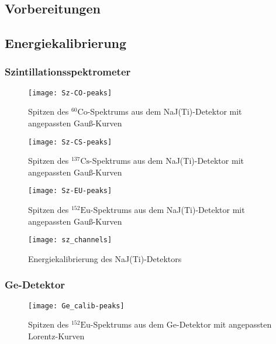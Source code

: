\documentclass[11pt, ngerman, fleqn, DIV=15, headinclude, BCOR=2cm]{scrreprt}
\newcommand{\plotwidth}{0.8\linewidth}
\begin{document}
\begin{appendix}


\chapter{Vorbereitungen}
\section{Energiekalibrierung}

\subsection{Szintillationsspektrometer}
\begin{figure}
    \centering
    \texttt{[image: Sz-CO-peaks]}
    \caption{%
	    Spitzen des $^{60}\text{Co}$-Spektrums aus dem NaJ(Ti)-Detektor
	    mit angepassten Gauß-Kurven
    }
    \label{fig:}
\end{figure}

\begin{figure}
    \centering
    \texttt{[image: Sz-CS-peaks]}
    \caption{%
	    Spitzen des $^{137}\text{Cs}$-Spektrums aus dem NaJ(Ti)-Detektor
	    mit angepassten Gauß-Kurven
    }
    \label{fig:}
\end{figure}

\begin{figure}
    \centering
    \texttt{[image: Sz-EU-peaks]}
    \caption{%
	    Spitzen des $^{152}\text{Eu}$-Spektrums aus dem NaJ(Ti)-Detektor
	    mit angepassten Gauß-Kurven
    }
    \label{fig:}
\end{figure}

\begin{figure}
    \centering
    \texttt{[image: sz\_channels]}
    \caption{%
	    Energiekalibrierung des NaJ(Ti)-Detektors
    }
    \label{fig:sz_kanal}
\end{figure}

\subsection{Ge-Detektor}

\begin{figure}
    \centering
    \texttt{[image: Ge\_calib-peaks]}
    \caption{%
	    Spitzen des $^{152}\text{Eu}$-Spektrums aus dem Ge-Detektor  mit
	    angepassten Lorentz-Kurven
    }
    \label{fig:Ge-peaks}
\end{figure}


\end{appendix}
\end{document}
